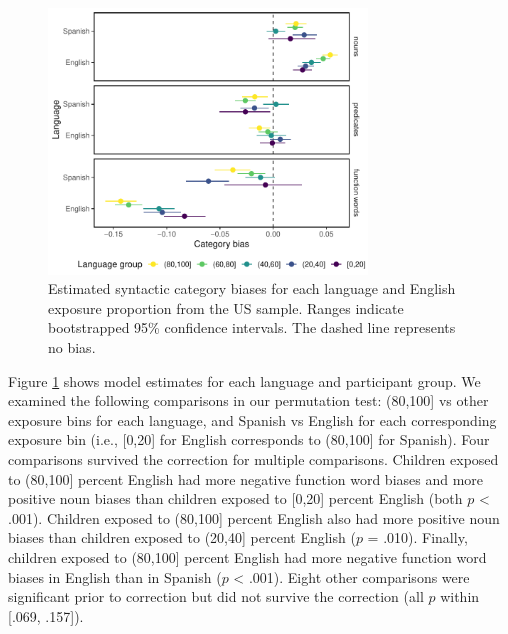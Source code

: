 \documentclass[10pt, letterpaper]{article}
\begin{document}
\begin{CodeChunk}
\begin{figure}[t]

{\centering \includegraphics[width=240pt]{figs/us_bias-1} 

}

\caption[Estimated syntactic category biases for each language and English exposure proportion from the US sample]{Estimated syntactic category biases for each language and English exposure proportion from the US sample. Ranges indicate bootstrapped 95\% confidence intervals. The dashed line represents no bias.}\label{fig:us_bias}
\end{figure}
\end{CodeChunk}

Figure \ref{fig:us_bias} shows model estimates for each language and
participant group. We examined the following comparisons in our
permutation test: (80,100{]} vs other exposure bins for each language,
and Spanish vs English for each corresponding exposure bin (i.e.,
{[}0,20{]} for English corresponds to (80,100{]} for Spanish). Four
comparisons survived the correction for multiple comparisons. Children
exposed to (80,100{]} percent English had more negative function word
biases and more positive noun biases than children exposed to {[}0,20{]}
percent English (both \(p\) \textless{} .001). Children exposed to
(80,100{]} percent English also had more positive noun biases than
children exposed to (20,40{]} percent English (\(p\) = .010). Finally,
children exposed to (80,100{]} percent English had more negative
function word biases in English than in Spanish (\(p\) \textless{}
.001). Eight other comparisons were significant prior to correction but
did not survive the correction (all \(p\) within {[}.069, .157{]}).
\end{document}
